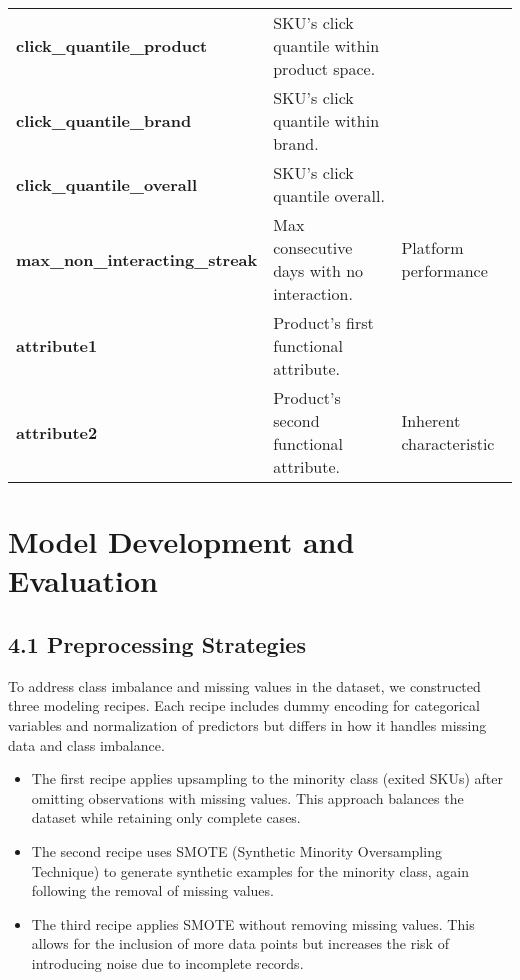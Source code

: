 \documentclass[
  letterpaper,
  DIV=11,
  numbers=noendperiod]{scrartcl}
\providecommand{\tightlist}{%
  \setlength{\itemsep}{0pt}\setlength{\parskip}{0pt}}\usepackage{longtable,booktabs,array}
\begin{document}
\begin{longtable}[t]{>{}lll}
\textbf{click\_quantile\_product} & SKU's click quantile within product space. & \\
\cmidrule{1-2}\nopagebreak
\textbf{click\_quantile\_brand} & SKU's click quantile within brand. & \\
\cmidrule{1-2}\nopagebreak
\textbf{click\_quantile\_overall} & SKU's click quantile overall. & \\
\cmidrule{1-2}\nopagebreak
\textbf{max\_non\_interacting\_streak} & Max consecutive days with no interaction. & \multirow[t]{-10}{*}{\raggedright\arraybackslash Platform performance}\\
\cmidrule{1-3}\pagebreak[0]
\textbf{attribute1} & Product's first functional attribute. & \\
\cmidrule{1-2}\nopagebreak
\textbf{attribute2} & Product's second functional attribute. & \multirow[t]{-2}{*}{\raggedright\arraybackslash Inherent characteristic}\\
\bottomrule
\end{longtable}

\section{Model Development and
Evaluation}\label{model-development-and-evaluation}

\subsection{4.1 Preprocessing
Strategies}\label{preprocessing-strategies}

To address class imbalance and missing values in the dataset, we
constructed three modeling recipes. Each recipe includes dummy encoding
for categorical variables and normalization of predictors but differs in
how it handles missing data and class imbalance.

\begin{itemize}
\tightlist
\item
  The first recipe applies upsampling to the minority class (exited
  SKUs) after omitting observations with missing values. This approach
  balances the dataset while retaining only complete cases.
\item
  The second recipe uses SMOTE (Synthetic Minority Oversampling
  Technique) to generate synthetic examples for the minority class,
  again following the removal of missing values.
\item
  The third recipe applies SMOTE without removing missing values. This
  allows for the inclusion of more data points but increases the risk of
  introducing noise due to incomplete records.
\end{itemize}
\end{document}
